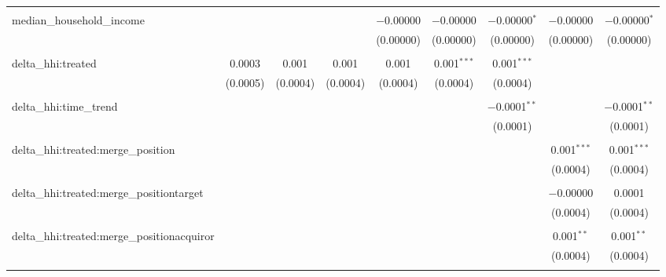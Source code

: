 \begin{table}[H]
{\begin{tabular}{@{\extracolsep{5pt}}lcccccccc}
   & & & & & & & & \\  

  median\_household\_income &  &  &  & $-$0.00000 & $-$0.00000 & $-$0.00000$^{*}$ & $-$0.00000 & $-$0.00000$^{*}$ \\  

   &  &  &  & (0.00000) & (0.00000) & (0.00000) & (0.00000) & (0.00000) \\  

   & & & & & & & & \\  

  delta\_hhi:treated & 0.0003 & 0.001 & 0.001 & 0.001 & 0.001$^{***}$ & 0.001$^{***}$ &  &  \\  

   & (0.0005) & (0.0004) & (0.0004) & (0.0004) & (0.0004) & (0.0004) &  &  \\  

   & & & & & & & & \\  

  delta\_hhi:time\_trend &  &  &  &  &  & $-$0.0001$^{**}$ &  & $-$0.0001$^{**}$ \\  

   &  &  &  &  &  & (0.0001) &  & (0.0001) \\  

   & & & & & & & & \\  

  delta\_hhi:treated:merge\_position &  &  &  &  &  &  & 0.001$^{***}$ & 0.001$^{***}$ \\  

   &  &  &  &  &  &  & (0.0004) & (0.0004) \\  

   & & & & & & & & \\  

  delta\_hhi:treated:merge\_positiontarget &  &  &  &  &  &  & $-$0.00000 & 0.0001 \\  

   &  &  &  &  &  &  & (0.0004) & (0.0004) \\  

   & & & & & & & & \\  

  delta\_hhi:treated:merge\_positionacquiror &  &  &  &  &  &  & 0.001$^{**}$ & 0.001$^{**}$ \\  

   &  &  &  &  &  &  & (0.0004) & (0.0004) \\  

   & & & & & & & & \\  


\end{tabular}}
\end{table}
